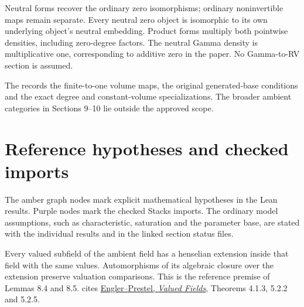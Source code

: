 \begin{proposition}
\label{prop:measured-zero-neutral-products}
\leanok
Neutral forms recover the ordinary zero isomorphisms; ordinary
noninvertible maps remain separate. Every neutral zero object is
isomorphic to its own underlying object's neutral embedding. Product
forms multiply both pointwise densities, including zero-degree
factors. The neutral Gamma density is multiplicative one, corresponding
to additive zero in the paper. No Gamma-to-RV section is assumed.
\end{proposition}

The  records the
finite-to-one volume maps, the original generated-base conditions
and the exact degree and constant-volume specializations. The
broader ambient categories in Sections 9--10 lie outside the
approved scope.

\section*{Reference hypotheses and checked imports}

The amber graph nodes mark explicit mathematical hypotheses in the
Lean results. Purple nodes mark the checked Stacks imports. The
ordinary model assumptions, such as characteristic, saturation and
the parameter base, are stated with the individual results and in
the linked section status files.

\begin{assumption}
\label{hyp:immediate-henselization}
Every valued subfield of the ambient field has a henselian extension
inside that field with the same values. Automorphisms of its algebraic
closure over the extension preserve valuation comparisons. This is the
reference premise of Lemmas 8.4 and 8.5.
 cites
\href{https://link.springer.com/book/10.1007/3-540-30035-X}{Engler--Prestel,
\emph{Valued Fields}}, Theorems 4.1.3, 5.2.2 and 5.2.5.
\end{assumption}

